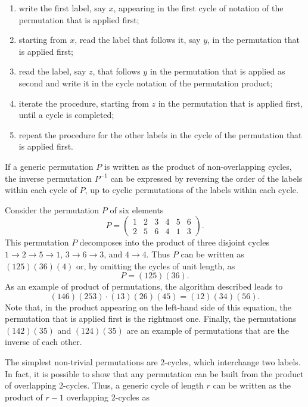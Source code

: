 \begin{enumerate}
    \item write the first label, say $x$, appearing in the first cycle of notation of the permutation that is applied first;
    \item starting from $x$, read the label that follows it, say $y$, in the permutation that is applied first;
    \item read the label, say $z$, that follows $y$ in the permutation that is applied as second and write it in the cycle notation of the permutation product;
    \item iterate the procedure, starting from $z$ in the permutation that is applied first, until a cycle is completed;
    \item repeat the procedure for the other labels in the cycle of the permutation that is applied first. 
\end{enumerate}
If a generic permutation $P$ is written as the product of non-overlapping cycles, the inverse permutation $P^{-1}$ can be expressed by reversing the order of the labels within each cycle of $P$, up to cyclic permutations of the labels within each cycle. 
\begin{ex}
    Consider the permutation $P$ of six elements 
    \begin{equation}
        P = 
        \begin{pmatrix}
            1 & 2 & 3 & 4 & 5 & 6 \\
            2& 5 & 6 & 4 & 1 & 3
        \end{pmatrix}.
    \end{equation}
    This permutation $P$ decomposes into the product of three disjoint cycles $1 \to 2 \to 5 \to 1$, $3 \to 6 \to 3$, and $4 \to 4$. Thus $P$ can be written as $(125)(36)(4)$ or, by omitting the cycles of unit length, as 
    \begin{equation}
        P = (125)(36).
    \end{equation}
    As an example of product of permutations, the algorithm described leads to 
    \begin{equation}
        (146)(253) \cdot (13)(26)(45) = (12)(34)(56).
    \end{equation}
    Note that, in the product appearing on the left-hand side of this equation, the permutation that is applied first is the rightmost one. Finally, the permutations $(142)(35)$ and $(124)(35)$ are an example of permutations that are the inverse of each other. 
\end{ex}
The simplest non-trivial permutations are 2-cycles, which interchange two labels. In fact, it is possible to show that any permutation can be built from the product of overlapping 2-cycles. Thus, a generic cycle of length $r$ can be written as the product of $r - 1$ overlapping 2-cycles as

